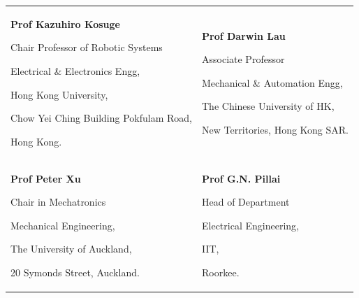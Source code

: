 
\begin{tabularx}{\textwidth}{@{}X X@{}}
\textbf{Prof Kazuhiro Kosuge}\par
Chair Professor of Robotic Systems\par
Electrical \& Electronics Engg,\par
Hong Kong University,\par
Chow Yei Ching Building
Pokfulam Road, \par
Hong Kong.\par
\makefield{\faEnvelopeO}{\url{kosuge@eee.hku.hk}}
&
\textbf{Prof Darwin Lau}\par
Associate Professor\par
Mechanical \& Automation Engg,\par
The Chinese University of HK,\par 
New Territories, Hong Kong SAR.\par
\makefield{\faEnvelopeO}{\url{darwinlau@cuhk.edu.hk}}
\\
\textbf{Prof Peter Xu}\par
Chair in Mechatronics\par
Mechanical Engineering,\par
The University of Auckland,\par 
20 Symonds Street, Auckland.\par 
\makefield{\faEnvelopeO}{\url{p.xu@auckland.ac.nz}}
&
\textbf{Prof G.N. Pillai}\par
Head of Department\par
Electrical Engineering,\par
IIT,\par 
Roorkee.\par
\makefield{\faEnvelopeO}{\url{gn.pillai@ee.iitr.ac.in}}
\\
\end{tabularx}
